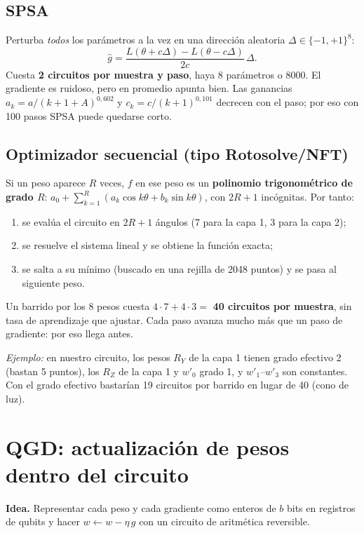 \documentclass[11pt,a4paper]{article}
\begin{document}
\subsection{SPSA}
Perturba \emph{todos} los parámetros a la vez en una dirección aleatoria $\Delta\in\{-1,+1\}^8$:
\[
  \hat g = \frac{L(\theta + c\Delta) - L(\theta - c\Delta)}{2c}\,\Delta .
\]
Cuesta \textbf{2 circuitos por muestra y paso}, haya 8 parámetros o 8000. El gradiente es ruidoso, pero en promedio
apunta bien. Las ganancias $a_k = a/(k+1+A)^{0{,}602}$ y $c_k = c/(k+1)^{0{,}101}$ decrecen con el paso; por eso con
100 pasos SPSA puede quedarse corto.

\subsection{Optimizador secuencial (tipo Rotosolve/NFT)}\label{sec:secuencial}
Si un peso aparece $R$ veces, $f$ en ese peso es un \textbf{polinomio trigonométrico de grado $R$}:
$a_0 + \sum_{k=1}^{R}(a_k\cos k\theta + b_k\sin k\theta)$, con $2R+1$ incógnitas. Por tanto:
\begin{enumerate}
  \item se evalúa el circuito en $2R+1$ ángulos (7 para la capa 1, 3 para la capa 2);
  \item se resuelve el sistema lineal y se obtiene la función exacta;
  \item se salta a su mínimo (buscado en una rejilla de 2048 puntos) y se pasa al siguiente peso.
\end{enumerate}
Un barrido por los 8 pesos cuesta $4\cdot7 + 4\cdot3 = $ \textbf{40 circuitos por muestra}, sin tasa de aprendizaje
que ajustar. Cada paso avanza mucho más que un paso de gradiente: por eso llega antes.

\emph{Ejemplo:} en nuestro circuito, los pesos $R_Y$ de la capa 1 tienen grado efectivo 2 (bastan 5 puntos), los
$R_Z$ de la capa 1 y $w'_0$ grado 1, y $w'_1$--$w'_3$ son constantes. Con el grado efectivo bastarían 19 circuitos por
barrido en lugar de 40 (cono de luz).

\section{QGD: actualización de pesos dentro del circuito}\label{sec:qgd}

\textbf{Idea.} Representar cada peso y cada gradiente como enteros de $b$ bits en registros de qubits y hacer
$w \leftarrow w - \eta\, g$ con un circuito de aritmética reversible.
\end{document}
